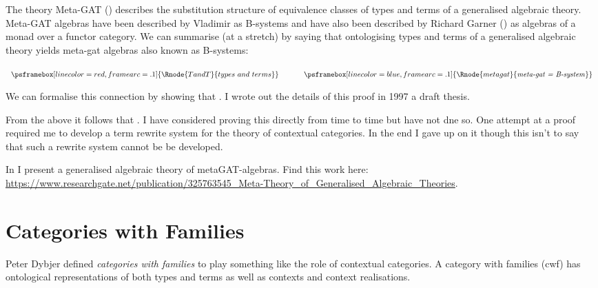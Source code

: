 \documentclass[10pt,a4paper]{article}
\theoremstyle{remark}
\newcommand{\attrtype}[1]{#1}
\renewcommand{\attrtype}[1]{\psframebox[linecolor=blue,framearc=.1]{#1}}
\newcommand{\etype}[1]{#1}
\renewcommand{\etype}[1]{\psframebox[linecolor=red,framearc=.1]{#1}}
\newcommand{\myurl}[1]{{\footnotesize \url{#1}}}
\begin{document}
\note The theory  Meta-GAT  (\cite{CartmellMetaTheory}) describes the substitution structure of equivalence classes of types and terms of a generalised algebraic theory. Meta-GAT algebras have been described by Vladimir as B-systems and have also been described by Richard Garner (\cite{Garner15}) as algebras of a monad over a functor category.  We can summarise (at a stretch) by saying that ontologising types and terms of a generalised algebraic theory yields meta-gat algebras also known as B-systems:

\begin{center}
$
\begin{array}{ c p{0.5cm} c}
\etype{\Rnode{TandT}{types\ and\ terms}} & & \attrtype{\Rnode{metagat}{\mbox{\textit{meta-gat = B-system}}}}
\end{array}                     
$
\setlength{\arrnodesepA}{7pt}
\setlength{\arrnodesepB}{7pt}
\end{center}

\note
We can formalise this connection by showing that  .  I wrote out the details of this proof in 1997 a draft thesis. 

\note
From the above it follows that 
. 
I have considered proving this directly from time to time but have not dne so.
\note
One attempt at a proof required me to develop a  term rewrite system for the theory of contextual categories. In the end I gave up on it though this isn't to say that such a rewrite system cannot be be developed.

\note 
In \cite{CartmellMetaTheory} I present a generalised algebraic theory of metaGAT-algebras.
Find this work here:\\
\myurl{https://www.researchgate.net/publication/325763545_Meta-Theory_of_Generalised_Algebraic_Theories}.

\section{Categories with Families}
\note Peter Dybjer defined \textit{categories with families}  to play something like the role of contextual categories. 
A category with families (cwf) has  ontological representations of both types and terms as well as contexts and context realisations. 
\end{document}
